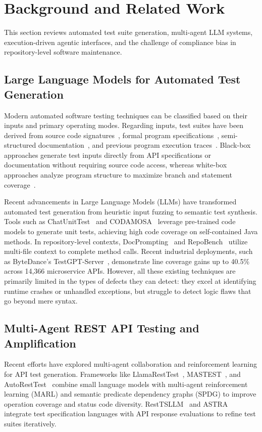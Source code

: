 \section{Background and Related Work}
\label{sec:related}

This section reviews automated test suite generation, multi-agent LLM systems, execution-driven agentic interfaces, and the challenge of compliance bias in repository-level software maintenance.

\subsection{Large Language Models for Automated Test Generation}
Modern automated software testing techniques can be classified based on their inputs and primary operating modes. Regarding inputs, test suites have been derived from source code signatures~\cite{bareiss2022code, schafer2023empirical}, formal program specifications~\cite{docprompting}, semi-structured documentation~\cite{testexplora}, and previous program execution traces~\cite{swebench}. Black-box approaches generate test inputs directly from API specifications or documentation without requiring source code access, whereas white-box approaches analyze program structure to maximize branch and statement coverage~\cite{evosuite, randoop, whiteboxrest2025}.

Recent advancements in Large Language Models (LLMs) have transformed automated test generation from heuristic input fuzzing to semantic test synthesis. Tools such as ChatUnitTest~\cite{xie2023chatunitest} and CODAMOSA~\cite{lemieux2023codamosa} leverage pre-trained code models to generate unit tests, achieving high code coverage on self-contained Java methods. In repository-level contexts, DocPrompting~\cite{docprompting} and RepoBench~\cite{repobench} utilize multi-file context to complete method calls. Recent industrial deployments, such as ByteDance's TestGPT-Server~\cite{testgptserver2025}, demonstrate line coverage gains up to 40.5\% across 14,366 microservice APIs. However, all these existing techniques are primarily limited in the types of defects they can detect: they excel at identifying runtime crashes or unhandled exceptions, but struggle to detect logic flaws that go beyond mere syntax.

\subsection{Multi-Agent REST API Testing and Amplification}
Recent efforts have explored multi-agent collaboration and reinforcement learning for API test generation. Frameworks like LlamaRestTest~\cite{llamaresttest2025}, MASTEST~\cite{mastest2025}, and AutoRestTest~\cite{autoresttest2025} combine small language models with multi-agent reinforcement learning (MARL) and semantic predicate dependency graphs (SPDG) to improve operation coverage and status code diversity. RestTSLLM~\cite{resttsllm2025} and ASTRA~\cite{astra2026} integrate test specification languages with API response evaluations to refine test suites iteratively.

